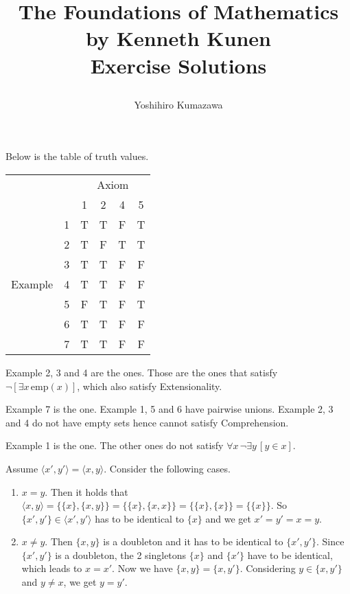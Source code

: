 \documentclass[12pt]{article}
\theoremstyle{definition}
\newenvironment{customthm}[1]
  {\renewcommand\theinnercustomthm{#1}\innercustomthm}
  {\endinnercustomthm}
\begin{document}
\sloppy
\title{
  The Foundations of Mathematics \\
  \large by Kenneth Kunen \\
  Exercise Solutions
  \author{Yoshihiro Kumazawa}
}
\maketitle

\begin{customthm}{I.2.1} Below is the table of truth values.
  \begin{center}
    \begin{tabular}{cc|cccc}
      & & \multicolumn{4}{c}{Axiom} \\
      & & 1 & 2 & 4 & 5 \\ \hline
      \multirow{7}{*}{Example}
      & 1 & T & T & F & T \\
      & 2 & T & F & T & T \\
      & 3 & T & T & F & F \\
      & 4 & T & T & F & F \\
      & 5 & F & T & F & T \\
      & 6 & T & T & F & F \\
      & 7 & T & T & F & F \\
    \end{tabular}
  \end{center}
\end{customthm}

\begin{customthm}{I.6.3} Example 2, 3 and 4 are the ones. Those are the ones that satisfy $\neg[\exists x\,\mathrm{emp}(x)]$, which also satisfy Extensionality.
\end{customthm}

\begin{customthm}{I.6.11} Example 7 is the one. Example 1, 5 and 6 have pairwise unions. Example 2, 3 and 4 do not have empty sets hence cannot satisfy Comprehension.
\end{customthm}

\begin{customthm}{I.6.13} Example 1 is the one. The other ones do not satisfy $\forall x\,\neg\exists y\,[y\in x]$.
\end{customthm}

\begin{customthm}{I.6.15} Assume $\langle x',y'\rangle = \langle x,y\rangle$. Consider the following cases.
\begin{enumerate}
\item \underline{$x=y$}. Then it holds that $\langle x,y\rangle = \{\{x\}, \{x,y\}\} = \{\{x\}, \{x,x\}\} = \{\{x\}, \{x\}\} = \{\{x\}\}$. So $\{x',y'\}\in\langle x',y'\rangle$ has to be  identical to $\{x\}$ and we get $x'=y'=x=y$.
\item \underline{$x\neq y$}. Then $\{x,y\}$ is a doubleton and it has to be identical to $\{x',y'\}$. Since $\{x',y'\}$ is a doubleton, the 2 singletons $\{x\}$ and $\{x'\}$ have to be identical, which leads to $x=x'$. Now we have $\{x,y\} = \{x,y'\}$. Considering $y\in \{x,y'\}$ and $y\neq x$, we get $y=y'$.
\end{enumerate}
\end{customthm}
\end{document}

